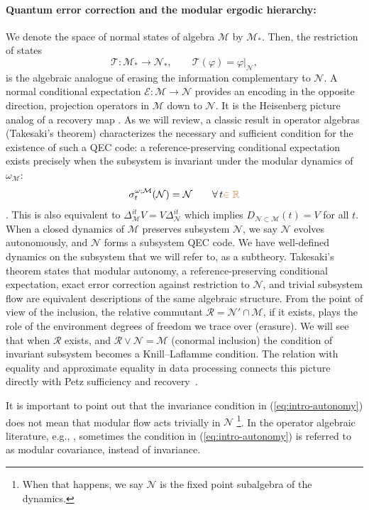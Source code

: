 \documentclass[a4paper,11pt]{article}
\theoremstyle{definition}
\newcommand{\mR}{\mathcal{R}}
\newcommand{\mN}{\mathcal{N}}
\newcommand{\mM}{\mathcal{M}}
\newcommand{\mE}{\mathcal{E}}
\newcommand{\KL}[1]{\textcolor{brown}{#1}}
\begin{document}
\paragraph{Quantum error correction and the modular ergodic hierarchy:} We denote the space of normal states of algebra $\mM$ by $\mM_*$. Then, the restriction of states
\begin{equation}
    \mathcal T:\mM_*\to\mN_*,
    \qquad
    \mathcal T(\varphi)=\varphi|_{\mN},
\end{equation}
is the algebraic analogue of erasing the information complementary to $\mN$.  A normal conditional expectation $\mE:\mM\to\mN$ provides an encoding in the opposite direction, projection operators in $\mM$ down to $\mN$. It is the Heisenberg picture analog of a recovery map \cite{furuya2022real,Faulkner2020}. As we will review, a classic result in operator algebras (Takesaki's theorem) characterizes the necessary and sufficient condition for the existence of such a QEC code: a reference-preserving conditional expectation exists precisely when the subsystem is invariant under the modular dynamics of $\omega_{\mM}$:
\begin{equation}
    \sigma_t^{\omega;\mM}(\mN)=\mN
    \qquad\forall\,t \KL{\in \mathbb{R}}
    \label{eq:intro-autonomy}
\end{equation}
\cite{Takesaki1972,Faulkner2020,furuya2022real}.  This is also equivalent to
$\Delta_{\mM}^{it}V=V\Delta_{\mN}^{it}$ which implies $D_{\mN\subset\mM}(t)=V$ for all $t$.  When a closed dynamics of $\mM$ preserves subsystem $\mN$, we say $\mN$ evolves autonomously, and $\mN$ forms a subsystem QEC code. We have well-defined dynamics on the subsystem that we will refer to, as a subtheory. Takesaki's theorem states that modular autonomy, a reference-preserving conditional expectation, exact error correction against restriction to $\mN$, and trivial subsystem flow are equivalent descriptions of the same algebraic structure.  From the point of view of the inclusion, the relative commutant $\mR=\mN'\cap \mM$, if it exists, plays the role of the environment degrees of freedom we trace over (erasure). We will see that when $\mR$ exists, and $\mR\vee \mN=\mM$ (conormal inclusion) the condition of invariant subsystem becomes a Knill--Laflamme condition.  The relation with equality and approximate equality in data processing connects this picture directly with Petz sufficiency and recovery~\cite{Petz1986,Petz1988,JungeRennerSutterWildeWinter2018,FaulknerHollandsSwingleWang2022}.

It is important to point out that the invariance condition in (\ref{eq:intro-autonomy}) does not mean that modular flow acts trivially in $\mN$ \footnote{When that happens, we say $\mN$ is the fixed point subalgebra of the dynamics.}. In the operator algebraic literature, e.g., \cite{revolutionizing}, sometimes the condition in (\ref{eq:intro-autonomy}) is referred to as modular covariance, instead of invariance. 
\end{document}
